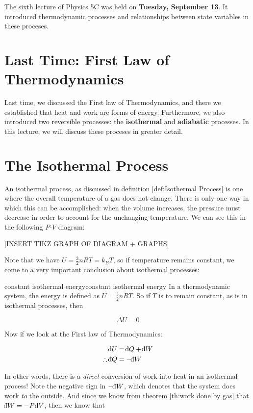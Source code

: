 The sixth lecture of Physics 5C was held on  \textbf{Tuesday, September 13}. It introduced thermodynamic processes and relationships between state variables in these proceses. 


\section{Last Time: First Law of Thermodynamics}

Last time, we discussed the First law of Thermodynamics, and there we established that heat and work are forms of energy. Furthermore, we also introduced two reversible processes: the \textbf{isothermal} and \textbf{adiabatic} processes. In this lecture, we will discuss these proceses in greater detail. 

\section{The Isothermal Process}

An isothermal process, as discussed in definition \ref{def:Isothermal Process} is one where the overall temperature of a gas does not change. There is only one way in which this can be accomplished: when the volume increases, the pressure must decrease in order to account for the unchanging temperature. We can see this in the following $P$-$V$ diagram:

[INSERT TIKZ GRAPH OF DIAGRAM + GRAPHS]

Note that we have $U = \frac{3}{2}nRT = k_BT$, so if temperature remains constant, we come to a very important conclusion about isothermal processes: 

\begin{theorem}{constant isothermal energy}{constant isothermal energy}
  In a thermodynamic system, the energy is defined as $U = \frac{3}{2}nRT$. So if $T$ is to remain constant, as is in isothermal processes, then 

  \[ \Delta U = 0\]
\end{theorem}

Now if we look at the First law of Thermodynamics: 

\begin{align*}
  \dd U &= \db Q + \db W \\
  \therefore \db Q &= -\db W
\end{align*}

In other words, there is a \textit{direct} conversion of work into heat in an isothermal process! Note the negative sign in $-\db W$, which denotes that the system does work \textit{to} the outside. And since we know from theorem \ref{th:work done by gas} that $\db W = -P \dd V$, then we know that 


